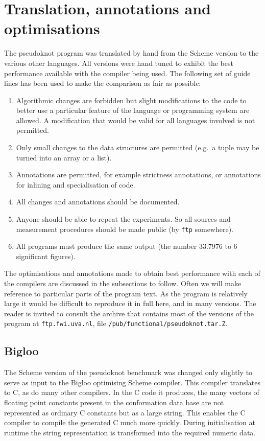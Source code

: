 \section{Translation, annotations and optimisations}
\label{sec:translation}
The pseudoknot program was translated by hand from the Scheme version
to the various other languages. All versions were hand tuned to
exhibit the best performance available with the compiler being used.
The following set of guide lines has been used to make the comparison
as fair as possible:
\begin{enumerate}
\item
Algorithmic changes are forbidden but slight modifications to the code
to better use a particular feature of the language or programming
system are allowed. A modification that would be valid for all
languages involved is not permitted.
\item
Only small changes to the data structures are permitted (e.g.\ a tuple
may be turned into an array or a list).
\item
Annotations are permitted, for example strictness annotations, or
annotations for inlining and specialisation of code.
\item
All changes and annotations should be documented.
\item
Anyone should be able to repeat the experiments. So all sources and
measurement procedures should be made public (by \verb=ftp= somewhere).
\item
All programs must produce the same output (the number 33.7976 to 6
significant figures).
\end{enumerate}

The optimisations and annotations made to obtain best performance with
each of the compilers are discussed in the subsections to follow. Often
we will make reference to particular parts of the program text. As the
program is relatively large it would be difficult to reproduce it in
full here, and in many versions. The reader is invited to consult the
archive that contains most of the versions of the program at
\verb=ftp.fwi.uva.nl=, file \verb=/pub/functional/pseudoknot.tar.Z=.

\subsection{Bigloo}
The Scheme version of the pseudoknot benchmark was changed only
slightly to serve as input to the Bigloo optimising Scheme compiler.
This compiler translates to C, as do many other compilers. In the C
code it produces, the many vectors of floating point constants present
in the conformation data base are not represented as ordinary C
constants but as a large string. This enables the C compiler to compile
the generated C much more quickly. During initialisation at runtime the
string representation is transformed into the required numeric data.

